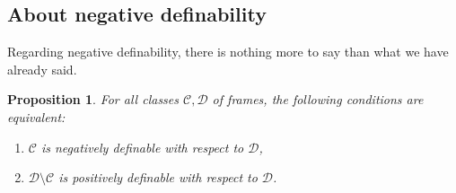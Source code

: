 \documentclass[draft]{article}
\newtheorem{proposition}{Proposition}
\newenvironment{proof}{{\bf Proof:}}{~$\dashv$\\}
\def\allfra{\mathbf{all}}
\def\dcfra{\mathbf{d}}
\begin{document}
%
%
%
%
%
%
%
%
%
%
%
%
%
%
%
%
%
%
\subsection{About negative definability}
%
%
Regarding negative definability, there is nothing more to say than what we have already said.
%
%
\begin{proposition}
%
%
For all classes ${\mathcal C},{\mathcal D}$ of frames, the following conditions are equivalent:
%
%
\begin{enumerate}
%
%
\item ${\mathcal C}$ is negatively definable with respect to ${\mathcal D}$,
%
%
\item ${\mathcal D}{\setminus}{\mathcal C}$ is positively definable with respect to ${\mathcal D}$.
%
%
\end{enumerate}
%
%
\end{proposition}
%
%
\end{document}
